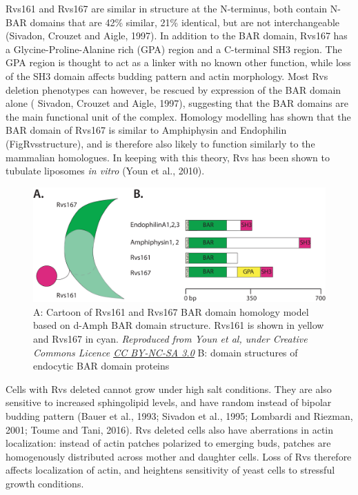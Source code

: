 	\vspace{5mm}
Rvs161 and Rvs167 are similar in structure at the N-terminus, both contain N-BAR domains that are 42\% similar, 21\% identical, but are not interchangeable (Sivadon, Crouzet and Aigle, 1997). In addition to the BAR domain, Rvs167 has a Glycine-Proline-Alanine rich (GPA) region and a C-terminal SH3 region. The GPA region is thought to act as a linker with no known other function, while loss of the SH3 domain affects budding pattern and actin morphology. Most Rvs deletion phenotypes can however, be rescued by expression of the BAR domain alone ( Sivadon, Crouzet and Aigle, 1997), suggesting that the BAR domains are the main functional unit of the complex. Homology modelling has shown that the BAR domain of Rvs167 is similar to Amphiphysin and Endophilin (FigRvsstructure), and is therefore also likely to function similarly to the mammalian homologues. In keeping with this theory, Rvs has been shown to tubulate liposomes \textit{in vitro} (Youn et al., 2010). 


\vspace{5mm}
\begin{figure}[H]
	\centering
	\includegraphics[scale=0.4]{figures/intro/Rvs_stucture2}
	\caption[Homolgy model of Rvs and BAR protein domains]
	{A: Cartoon of Rvs161 and Rvs167 BAR domain homology model based on d-Amph BAR domain structure. Rvs161 is shown in yellow and Rvs167 in cyan. 
		\textit{Reproduced from Youn et al, under Creative Commons Licence \href{https://creativecommons.org/licenses/by-nc-sa/3.0/}{CC BY-NC-SA 3.0}}
		B: domain structures of endocytic BAR domain proteins
		\label{rvs_structure}}
\end{figure}


	\vspace{5mm}
	\newpage
Cells with Rvs deleted cannot grow under high salt conditions. They are also sensitive to increased sphingolipid levels, and have random instead of bipolar budding pattern (Bauer et al., 1993; Sivadon et al., 1995; Lombardi and Riezman, 2001; Toume and Tani, 2016). Rvs deleted cells also have aberrations in actin localization: instead of actin patches polarized to emerging buds, patches are homogenously distributed across mother and daughter cells. Loss of Rvs therefore affects localization of actin, and heightens sensitivity of yeast cells to stressful growth conditions.
 	
